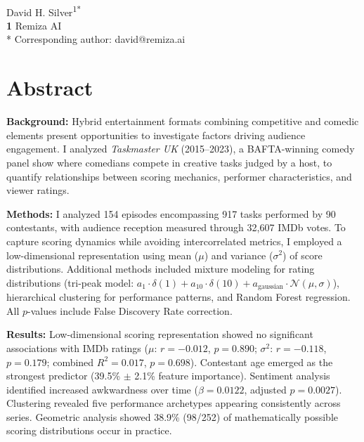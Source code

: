 \documentclass[10pt,letterpaper]{article}
\begin{document}
\vspace*{0.2in}

\begin{flushleft}
{\Large
\textbf{}
}
\newline
\\
David H. Silver\textsuperscript{1*}
\\
\bigskip
\textbf{1} Remiza AI\\
\bigskip
* Corresponding author: david@remiza.ai
\end{flushleft}

\section*{Abstract}
\textbf{Background:} Hybrid entertainment formats combining competitive and comedic elements present opportunities to investigate factors driving audience engagement. I analyzed \textit{Taskmaster UK} (2015--2023), a BAFTA-winning comedy panel show where comedians compete in creative tasks judged by a host, to quantify relationships between scoring mechanics, performer characteristics, and viewer ratings.

\textbf{Methods:} I analyzed 154 episodes encompassing 917 tasks performed by 90 contestants, with audience reception measured through 32{,}607 IMDb votes. To capture scoring dynamics while avoiding intercorrelated metrics, I employed a low-dimensional representation using mean ($\mu$) and variance ($\sigma^2$) of score distributions. Additional methods included mixture modeling for rating distributions (tri-peak model: $a_1\cdot\delta(1) + a_{10}\cdot\delta(10) + a_{\text{gaussian}}\cdot\mathcal{N}(\mu,\sigma)$), hierarchical clustering for performance patterns, and Random Forest regression. All $p$-values include False Discovery Rate correction.

\textbf{Results:} Low-dimensional scoring representation showed no significant associations with IMDb ratings ($\mu$: $r = -0.012$, $p = 0.890$; $\sigma^2$: $r = -0.118$, $p = 0.179$; combined $R^2 = 0.017$, $p = 0.698$). Contestant age emerged as the strongest predictor (39.5\% $\pm$ 2.1\% feature importance). Sentiment analysis identified increased awkwardness over time ($\beta = 0.0122$, adjusted $p = 0.0027$). Clustering revealed five performance archetypes appearing consistently across series. Geometric analysis showed 38.9\% (98/252) of mathematically possible scoring distributions occur in practice.
\end{document}
